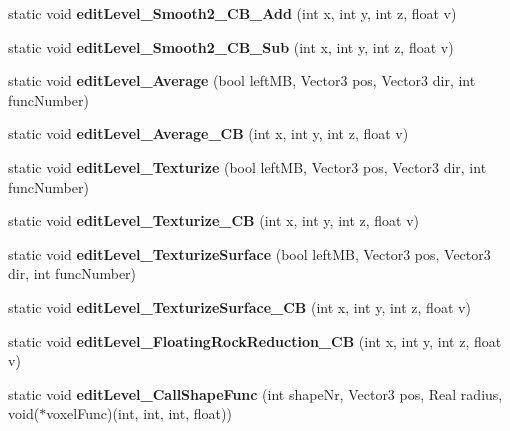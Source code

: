 \begin{DoxyCompactItemize}
\item 
\hypertarget{classGame_a41bcffd633925236850ccdaa7514a25a}{
static void {\bfseries edit\-Level\-\_\-\-Smooth2\-\_\-\-C\-B\-\_\-\-Add} (int x, int y, int z, float v)}
\label{d9/d68/classGame_a41bcffd633925236850ccdaa7514a25a}

\item 
\hypertarget{classGame_a66f453b5eb02e8285f0ec1b798a3c2ef}{
static void {\bfseries edit\-Level\-\_\-\-Smooth2\-\_\-\-C\-B\-\_\-\-Sub} (int x, int y, int z, float v)}
\label{d9/d68/classGame_a66f453b5eb02e8285f0ec1b798a3c2ef}

\item 
\hypertarget{classGame_a3a2daae3b2fec0c4c2626f354add7c4d}{
static void {\bfseries edit\-Level\-\_\-\-Average} (bool left\-M\-B, \-Vector3 pos, \-Vector3 dir, int func\-Number)}
\label{d9/d68/classGame_a3a2daae3b2fec0c4c2626f354add7c4d}

\item 
\hypertarget{classGame_a0f755e573d605c0f8d0dd2dcf8c31add}{
static void {\bfseries edit\-Level\-\_\-\-Average\-\_\-\-C\-B} (int x, int y, int z, float v)}
\label{d9/d68/classGame_a0f755e573d605c0f8d0dd2dcf8c31add}

\item 
\hypertarget{classGame_a832309ebefb2daaeb2a4bc29515a1831}{
static void {\bfseries edit\-Level\-\_\-\-Texturize} (bool left\-M\-B, \-Vector3 pos, \-Vector3 dir, int func\-Number)}
\label{d9/d68/classGame_a832309ebefb2daaeb2a4bc29515a1831}

\item 
\hypertarget{classGame_a3eace3089caab03f4e0b6c12b12b72a0}{
static void {\bfseries edit\-Level\-\_\-\-Texturize\-\_\-\-C\-B} (int x, int y, int z, float v)}
\label{d9/d68/classGame_a3eace3089caab03f4e0b6c12b12b72a0}

\item 
\hypertarget{classGame_a137b215d1cb5e6503b96eb55e76a11b8}{
static void {\bfseries edit\-Level\-\_\-\-Texturize\-Surface} (bool left\-M\-B, \-Vector3 pos, \-Vector3 dir, int func\-Number)}
\label{d9/d68/classGame_a137b215d1cb5e6503b96eb55e76a11b8}

\item 
\hypertarget{classGame_aa6514f6afd01a644684a2e47f339d90a}{
static void {\bfseries edit\-Level\-\_\-\-Texturize\-Surface\-\_\-\-C\-B} (int x, int y, int z, float v)}
\label{d9/d68/classGame_aa6514f6afd01a644684a2e47f339d90a}

\item 
\hypertarget{classGame_a648a50062e2765ea514da191894058ef}{
static void {\bfseries edit\-Level\-\_\-\-Floating\-Rock\-Reduction\-\_\-\-C\-B} (int x, int y, int z, float v)}
\label{d9/d68/classGame_a648a50062e2765ea514da191894058ef}

\item 
\hypertarget{classGame_ade18921b676ea192e9d29c2dbc7a0099}{
static void {\bfseries edit\-Level\-\_\-\-Call\-Shape\-Func} (int shape\-Nr, \-Vector3 pos, \-Real radius, void($\ast$voxel\-Func)(int, int, int, float))}
\label{d9/d68/classGame_ade18921b676ea192e9d29c2dbc7a0099}

\end{DoxyCompactItemize}
